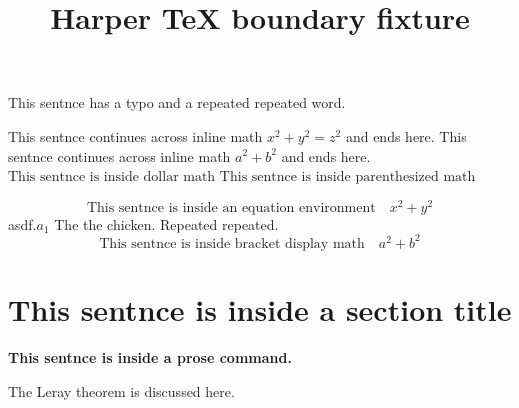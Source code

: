 \documentclass{article}
\title{Harper TeX boundary fixture}
\begin{document}
This sentnce has a typo and a repeated repeated word.

This sentnce continues across inline math $x^2 + y^2 = z^2$ and ends here.
This sentnce continues across inline math \(a^2 + b^2\) and ends here.
\
$\text{This sentnce is inside dollar math}$
\(\text{This sentnce is inside parenthesized math}\)

\begin{equation}
  \text{This sentnce is inside an equation environment} \quad x^2 + y^2
\end{equation}
asdf.$a_{1}$ The the chicken. 
Repeated repeated.
\[
  \text{This sentnce is inside bracket display math} \quad a^2 + b^2
\]

\section{This sentnce is inside a section title}
\textbf{This sentnce is inside a prose command.}
\newcommand{\technicalname}{NonsensicalTechnicalToken}

The Leray theorem is discussed here.
\end{document}
